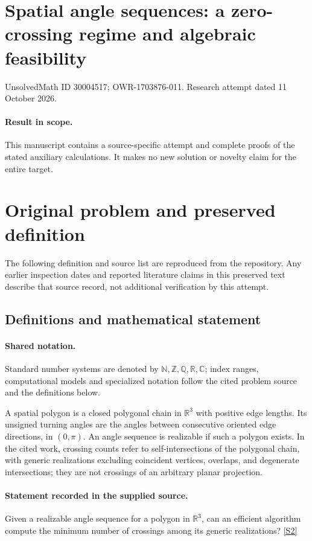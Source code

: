 \documentclass[11pt]{article}
\begin{document}
\section*{Spatial angle sequences: a zero-crossing regime and algebraic feasibility}
\noindent UnsolvedMath ID 30004517; OWR-1703876-011. Research attempt dated 11 October 2026.
\paragraph{Result in scope.}This manuscript contains a source-specific attempt and complete proofs of the stated auxiliary calculations. It makes no new solution or novelty claim for the entire target.
\section{Original problem and preserved definition}
The following definition and source list are reproduced from the repository. Any earlier inspection dates and reported literature claims in this preserved text describe that source record, not additional verification by this attempt.
\subsection{Definitions and mathematical statement}

\paragraph{Shared notation.}Standard number systems are denoted by $\mathbb N,\mathbb Z,\mathbb Q,\mathbb R,\mathbb C$; index ranges, computational models and specialized notation follow the cited problem source and the definitions below.


A spatial polygon is a closed polygonal chain in $\mathbb R^3$ with positive edge lengths. Its unsigned turning angles are the angles between consecutive oriented edge directions, in $(0,\pi)$. An angle sequence is realizable if such a polygon exists. In the cited work, crossing counts refer to self-intersections of the polygonal chain, with generic realizations excluding coincident vertices, overlaps, and degenerate intersections; they are not crossings of an arbitrary planar projection.
\paragraph{Statement recorded in the supplied source.}
Given a realizable angle sequence for a polygon in $\mathbb{R}^3$, can an efficient algorithm compute the minimum number of crossings among its generic realizations? \href{https://doi.org/10.4171/owr/2020/30}{[S2]}
\end{document}
